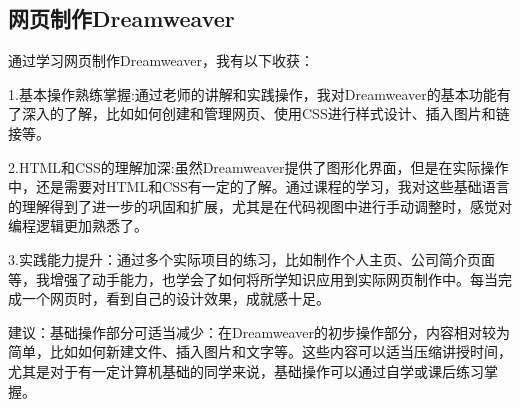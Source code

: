 \documentclass[supercite]{Experimental_Report}
\theoremstyle{definition}
\begin{document}
\subsection{网页制作Dreamweaver}
通过学习网页制作Dreamweaver，我有以下收获：
\par 1.基本操作熟练掌握:通过老师的讲解和实践操作，我对Dreamweaver的基本功能有了深入的了解，比如如何创建和管理网页、使用CSS进行样式设计、插入图片和链接等。
\par 2.HTML和CSS的理解加深:虽然Dreamweaver提供了图形化界面，但是在实际操作中，还是需要对HTML和CSS有一定的了解。通过课程的学习，我对这些基础语言的理解得到了进一步的巩固和扩展，尤其是在代码视图中进行手动调整时，感觉对编程逻辑更加熟悉了。
\par 3.实践能力提升：通过多个实际项目的练习，比如制作个人主页、公司简介页面等，我增强了动手能力，也学会了如何将所学知识应用到实际网页制作中。每当完成一个网页时，看到自己的设计效果，成就感十足。

\par 建议：基础操作部分可适当减少：在Dreamweaver的初步操作部分，内容相对较为简单，比如如何新建文件、插入图片和文字等。这些内容可以适当压缩讲授时间，尤其是对于有一定计算机基础的同学来说，基础操作可以通过自学或课后练习掌握。
\nocite{*} %
%
%
\end{document}
